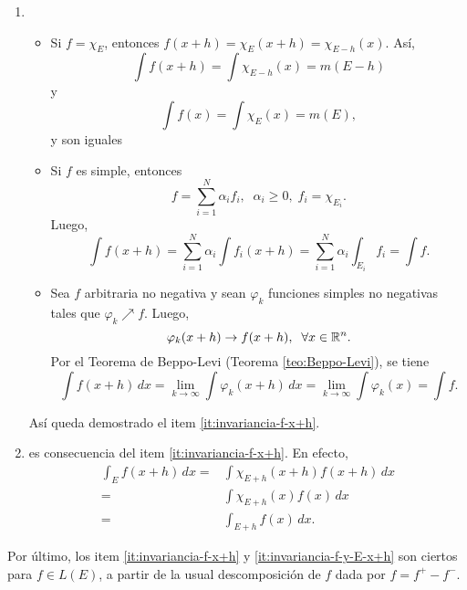                     \begin{demo}
                    \begin{enumerate}
                        \item 
                    \begin{itemize}
                        \item Si $f=\chi_E$, entonces 
                        $f(x+h)=\chi_E (x+h) =\chi_{E-h}(x).$
                        As\'i, 
                        \[
                        \int f(x+h)= \int \chi_{E-h} (x) =m(E-h)
                        \]
                        y 
                        \[
                        \int f(x) = \int \chi_E(x)=m(E),
                        \]
                        y son iguales
                        \item Si $f$ es simple, entonces 
                        \[  f=\sum\limits_{i=1}^N \alpha_i f_i, \;\; \alpha_i\geq 0,\;f_i=\chi_{E_i}.
                        \]
                        Luego, 
                        \[
                        \int f(x+h) =\sum\limits_{i=1}^N \alpha_i \int f_i(x+h)=
                        \sum\limits_{i=1}^N \alpha_i \int_{E_i} f_i= \int f.
                        \]
                        \item Sea $f$ arbitraria no negativa y sean $\varphi_k$ funciones simples no negativas tales que $\varphi_k \nearrow f$. Luego, 
                        \[
                        \varphi_k(x+h)\to f(x+h), \;\;\forall x \in \mathbb{R}^n.
                        \]
                        Por el Teorema de Beppo-Levi (Teorema \ref{teo:Beppo-Levi}), se tiene
                        \[
                        \int f(x+h)\,dx=\lim\limits_{k \to \infty} \int \varphi_k(x+h)\,dx=
                        \lim\limits_{k\to \infty} \int \varphi_k(x) =\int f.
                        \]
                    \end{itemize}
                    As\'i queda demostrado el item \ref{it:invariancia-f-x+h}.
                    \item es consecuencia del item \ref{it:invariancia-f-x+h}. En efecto, 
                    \[\begin{split} 
                    \int_E f(x+h) \,dx=& \int \chi_{E+h}(x+h) f(x+h) \,dx
                    \\
                    =&
                    \int \chi_{E+h} (x) f(x)\,dx 
                    \\
                    =&
                    \int_{E+h} f(x)\,dx.
                    \end{split}\]
                    \end{enumerate}
                    Por \'ultimo, los item \ref{it:invariancia-f-x+h} y   \ref{it:invariancia-f-y-E-x+h} son ciertos para $f\in L(E)$,  a partir de la usual descomposici\'on de $f$ dada por $f=f^{+}-f^{-}$.
                    \end{demo}
                    
